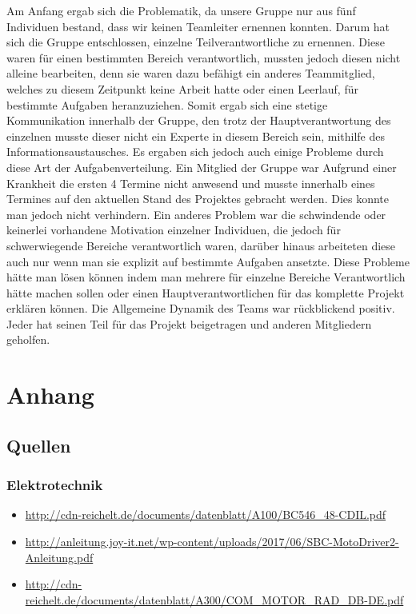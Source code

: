 \documentclass{report}
\begin{document}
Am Anfang ergab sich die Problematik, da unsere Gruppe nur aus fünf Individuen bestand, dass wir keinen Teamleiter ernennen konnten. Darum hat sich die Gruppe entschlossen, einzelne Teilverantwortliche zu ernennen. Diese waren für einen bestimmten Bereich verantwortlich, mussten jedoch diesen nicht alleine bearbeiten, denn sie waren dazu befähigt ein anderes Teammitglied, welches zu diesem Zeitpunkt keine Arbeit hatte oder einen Leerlauf, für bestimmte Aufgaben heranzuziehen.
Somit ergab sich eine stetige Kommunikation innerhalb der Gruppe, den trotz der Hauptverantwortung des einzelnen musste dieser nicht ein Experte in diesem Bereich sein, mithilfe des Informationsaustausches.
Es ergaben sich jedoch auch einige Probleme durch diese Art der Aufgabenverteilung. Ein Mitglied der Gruppe war Aufgrund einer Krankheit die ersten 4 Termine nicht anwesend und musste innerhalb eines Termines auf den aktuellen Stand des Projektes gebracht werden. Dies konnte man jedoch nicht verhindern. Ein anderes Problem war die schwindende oder keinerlei vorhandene Motivation einzelner Individuen, die jedoch für schwerwiegende Bereiche verantwortlich waren, darüber hinaus arbeiteten diese auch nur wenn man sie explizit auf bestimmte Aufgaben ansetzte. 
Diese Probleme hätte man lösen können indem man mehrere für einzelne Bereiche Verantwortlich hätte machen sollen oder einen Hauptverantwortlichen für das komplette Projekt erklären können.
Die Allgemeine Dynamik des Teams war rückblickend positiv. Jeder hat seinen Teil für das Projekt beigetragen und anderen Mitgliedern geholfen.


\chapter{Anhang}

\section{Quellen}

\subsection{Elektrotechnik}
\begin{itemize}

\item \url{http://cdn-reichelt.de/documents/datenblatt/A100/BC546_48-CDIL.pdf}


\item \url{http://anleitung.joy-it.net/wp-content/uploads/2017/06/SBC-MotoDriver2-Anleitung.pdf}

\item \url{http://cdn-reichelt.de/documents/datenblatt/A300/COM_MOTOR_RAD_DB-DE.pdf}

\end{itemize}
\end{document}
